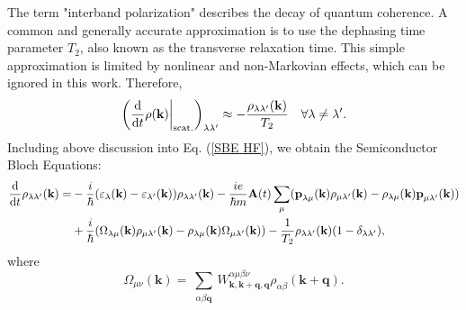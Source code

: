 \documentclass[12pt,english,a4paper]{article}
\begin{document}
\quad The term "interband polarization" describes the decay of quantum coherence. A common and generally accurate approximation is to use the dephasing time parameter $T_2$, also known as the transverse relaxation time. This simple approximation is limited by nonlinear and non-Markovian effects, which can be ignored in this work. Therefore,
\begin{equation}
	\bigg(\dv{ }{t} \rho(\textbf{k})\bigg|_{\mathrm{scat.}}\bigg)_{\lambda \lambda'} \approx -\frac{\rho_{\lambda \lambda'}(\textbf{k})}{T_2}\quad \forall \lambda \neq \lambda'. 
\end{equation}
Including above discussion into Eq. (\ref{SBE HF}), we obtain the Semiconductor Bloch Equations\cite{haug_quantum_2009}:
\begin{align}
	\label{SBE}
	\dv{ }{t}\rho_{\lambda\lambda'}(\textbf{k}) = &- \frac{i}{\hbar} (\varepsilon_\lambda(\textbf{k}) - \varepsilon_{\lambda'} (\textbf{k}))\rho_{\lambda \lambda'}(\textbf{k}) - \frac{ie}{\hbar m} \textbf{A}(t)\sum_{\mu}(\textbf{p}_{\lambda\mu}(\textbf{k})\rho_{\mu \lambda'}(\textbf{k}) - \rho_{\lambda\mu}(\textbf{k})\textbf{p}_{\mu \lambda'}(\textbf{k})) \nonumber \\
	&+ \frac{i}{\hbar}(\Omega_{\lambda \mu}(\textbf{k})\rho_{\mu \lambda'}(\textbf{k}) - \rho_{\lambda\mu}(\textbf{k}) \Omega_{\mu \lambda'} (\textbf{k})) -\frac{1}{T_2}\rho_{\lambda\lambda'}(\textbf{k})(1-\delta_{\lambda\lambda'}),
\end{align}
\quad where
\begin{equation}
	\Omega_{\mu\nu} (\textbf{k})=\sum_{\substack{\alpha\beta \textbf{q}}} W^{\alpha \mu \beta \nu}_{\textbf{k},\textbf{k}+\textbf{q},\textbf{q}} \rho_{\alpha\beta} (\textbf{k}+\textbf{q}).
\end{equation}
\end{document}
